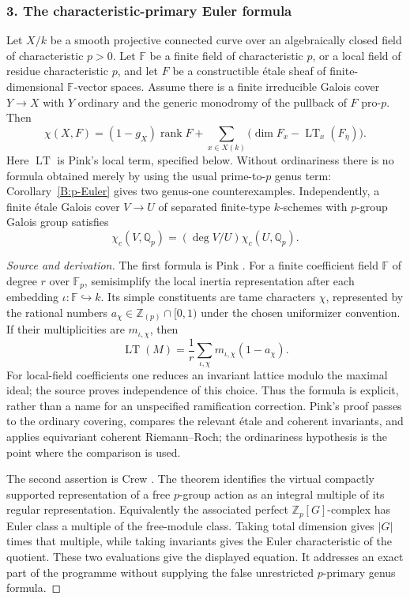 \subsubsection{3. The characteristic-primary Euler formula}
\begin{proposition}\label{B:subject3}
Let $X/k$ be a smooth projective connected curve over an algebraically closed field of characteristic $p>0$. Let $\mathbb F$ be a finite field of characteristic $p$, or a local field of residue characteristic $p$, and let $F$ be a constructible \'etale sheaf of finite-dimensional $\mathbb F$-vector spaces. Assume there is a finite irreducible Galois cover $Y\to X$ with $Y$ ordinary and the generic monodromy of the pullback of $F$ pro-$p$. Then
\[
 \chi(X,F)=(1-g_X)\operatorname{rank}F+
 \sum_{x\in X(k)}\bigl(\dim F_x-\operatorname{LT}_x(F_{\bar\eta})\bigr).
\]
Here $\operatorname{LT}$ is Pink's local term, specified below. Without ordinariness there is no formula obtained merely by using the usual prime-to-$p$ genus term: Corollary~\ref{B:p-Euler} gives two genus-one counterexamples. Independently, a finite \'etale Galois cover $V\to U$ of separated finite-type $k$-schemes with $p$-group Galois group satisfies
\[
 \chi_c(V,\mathbb Q_p)=(\deg V/U)\chi_c(U,\mathbb Q_p).
\]
\end{proposition}
\begin{proof}[Source and derivation]
The first formula is Pink \cite[Theorem 0.2; Definitions 5.2--5.5]{BPink2000}. For a finite coefficient field $\mathbb F$ of degree $r$ over $\mathbb F_p$, semisimplify the local inertia representation after each embedding $\iota:\mathbb F\hookrightarrow k$. Its simple constituents are tame characters $\chi$, represented by the rational numbers $a_\chi\in\mathbb Z_{(p)}\cap[0,1)$ under the chosen uniformizer convention. If their multiplicities are $m_{\iota,\chi}$, then
\[
 \operatorname{LT}(M)=\frac1r\sum_{\iota,\chi}m_{\iota,\chi}(1-a_\chi).
\]
For local-field coefficients one reduces an invariant lattice modulo the maximal ideal; the source proves independence of this choice. Thus the formula is explicit, rather than a name for an unspecified ramification correction. Pink's proof passes to the ordinary covering, compares the relevant \'etale and coherent invariants, and applies equivariant coherent Riemann--Roch; the ordinariness hypothesis is the point where the comparison is used.

The second assertion is Crew \cite[Theorem 1.5 and Corollary 1.7]{BCrew1984}. The theorem identifies the virtual compactly supported representation of a free $p$-group action as an integral multiple of its regular representation. Equivalently the associated perfect $\mathbb Z_p[G]$-complex has Euler class a multiple of the free-module class. Taking total dimension gives $|G|$ times that multiple, while taking invariants gives the Euler characteristic of the quotient. These two evaluations give the displayed equation. It addresses an exact part of the programme without supplying the false unrestricted $p$-primary genus formula.
\end{proof}

